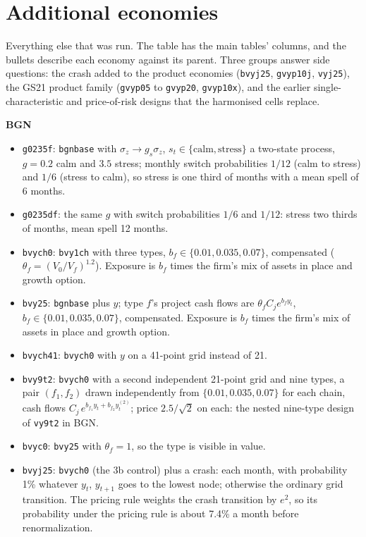 \documentclass[11pt]{article}
\begin{document}
\section{Additional economies}\label{sec:appendix}

Everything else that was run. The table has the main tables' columns, and the bullets describe each economy against its parent. Three groups answer side questions: the crash added to the product economies (\texttt{bvyj25}, \texttt{gvyp10j}, \texttt{vyj25}), the GS21 product family (\texttt{gvyp05} to \texttt{gvyp20}, \texttt{gvyp10x}), and the earlier single-characteristic and price-of-risk designs that the harmonised cells replace.



\noindent\textbf{BGN}
\begin{itemize}
\item \texttt{g0235f}: \texttt{bgnbase} with $\sigma_z\to g_s\sigma_z$, $s_t\in\{\text{calm},\text{stress}\}$ a two-state process, $g=0.2$ calm and $3.5$ stress; monthly switch probabilities $1/12$ (calm to stress) and $1/6$ (stress to calm), so stress is one third of months with a mean spell of 6 months.
\item \texttt{g0235df}: the same $g$ with switch probabilities $1/6$ and $1/12$: stress two thirds of months, mean spell 12 months.
\item \texttt{bvych0}: \texttt{bvy1ch} with three types, $b_f\in\{0.01,0.035,0.07\}$, compensated ($\theta_f=(V_0/V_f)^{1.2}$). Exposure is $b_f$ times the firm's mix of assets in place and growth option.
\item \texttt{bvy25}: \texttt{bgnbase} plus $y$; type $f$'s project cash flows are $\theta_f C_j e^{b_f y_t}$, $b_f\in\{0.01,0.035,0.07\}$, compensated. Exposure is $b_f$ times the firm's mix of assets in place and growth option.
\item \texttt{bvych41}: \texttt{bvych0} with $y$ on a 41-point grid instead of 21.
\item \texttt{bvy9t2}: \texttt{bvych0} with a second independent 21-point grid and nine types, a pair $(f_1,f_2)$ drawn independently from $\{0.01,0.035,0.07\}$ for each chain, cash flows $C_j\,e^{b_{f_1}y_t+b_{f_2}y^{(2)}_t}$; price $2.5/\sqrt2$ on each: the nested nine-type design of \texttt{vy9t2} in BGN.
\item \texttt{bvyc0}: \texttt{bvy25} with $\theta_f=1$, so the type is visible in value.
\item \texttt{bvyj25}: \texttt{bvych0} (the 3b control) plus a crash: each month, with probability 1\% whatever $y_t$, $y_{t+1}$ goes to the lowest node; otherwise the ordinary grid transition. The pricing rule weights the crash transition by $e^{2}$, so its probability under the pricing rule is about 7.4\% a month before renormalization.

\end{itemize}
\end{document}
